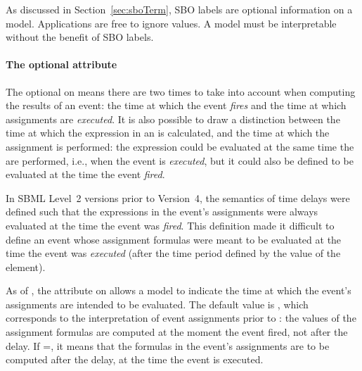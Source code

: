 As discussed in Section~\ref{sec:sboTerm}, SBO labels are optional
information on a model.  Applications are free to ignore
 values.  A model must be interpretable without the
benefit of SBO labels.

\begin{blockChanged}

\paragraph{The optional  attribute}
\label{sec:event-usevaluesfromtriggertime}

The optional \Delay on \Event means there are two times to take
into account when computing the results of an event: the time at
which the event \emph{fires} and the time at which assignments are
\emph{executed}.  It is also possible to draw a distinction
between the time at which the expression in an \EventAssignment is
calculated, and the time at which the assignment is performed: the
expression could be evaluated at the same time the  are
performed, i.e., when the event is \emph{executed}, but it could
also be defined to be evaluated at the time the event
\emph{fired}.

In SBML Level~2 versions prior to Version~4, the semantics of
\Event time delays were defined such that the expressions in the
event's assignments were always evaluated at the time the event
was \emph{fired}.  This definition made it difficult to define an
event whose assignment formulas were meant to be evaluated at the
time the event was \emph{executed} (\ie after the time period
defined by the value of the \Delay element).

As of \sbmltwofour, the  attribute
on \Event allows a model to indicate the time at which the event's
assignments are intended to be evaluated.  The default value is
, which corresponds to the interpretation of event
assignments prior to \sbmltwofour: the values of the assignment
formulas are computed at the moment the event fired, not after the
delay.  If =, it means
that the formulas in the event's assignments are to be computed
after the delay, at the time the event is executed.

\end{blockChanged}


\subsubsection{}
\label{sec:trigger}
\label{sec:event-trigger}

